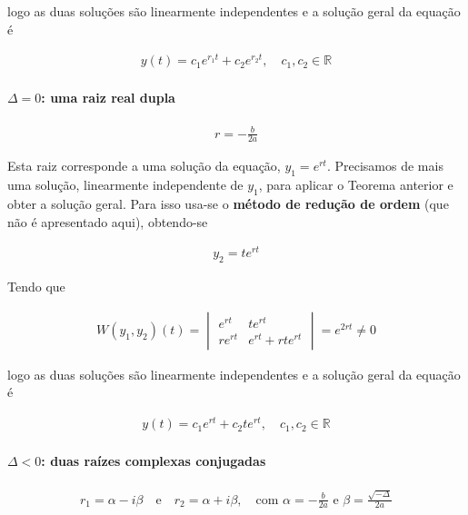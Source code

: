 \documentclass{article}
\begin{document}
logo as duas soluções são linearmente independentes e a solução geral da equação é

\begin{gather*}
\boxed{y(t) = c_1 e^{r_1 t} + c_2 e^{r_2 t}, \quad c_1, c_2 \in \mathbb{R}}
\end{gather*}

\paragraph{$\Delta = 0$: uma raiz real dupla}

\begin{gather*}
r = -\frac{b}{2a}
\end{gather*}

Esta raiz corresponde a uma solução da equação, $y_1 = e^{rt}$.
Precisamos de mais uma solução, linearmente independente de $y_1$, para aplicar o Teorema anterior
e obter a solução geral.
Para isso usa-se o \textbf{método de redução de ordem} (que não é apresentado aqui), obtendo-se

\begin{gather*}
y_2 = t e^{rt}
\end{gather*}

Tendo que

\begin{gather*}
W(y_1, y_2)(t) =
\begin{vmatrix}
e^{rt} & t e^{rt} \\
r e^{rt} & e^{rt} + r t e^{rt}
\end{vmatrix}
= e^{2rt} \neq 0
\end{gather*}

logo as duas soluções são linearmente independentes e a solução geral da equação é

\begin{gather*}
\boxed{y(t) = c_1 e^{rt} + c_2 t e^{rt}, \quad c_1, c_2 \in \mathbb{R}}
\end{gather*}

\paragraph{$\Delta < 0$: duas raízes complexas conjugadas}

\begin{gather*}
r_1 = \alpha - i \beta \quad \text{e} \quad r_2 = \alpha + i \beta,
\quad \text{com } \alpha = -\frac{b}{2a} \text{ e } \beta = \frac{\sqrt{-\Delta}}{2a}
\end{gather*}
\end{document}
